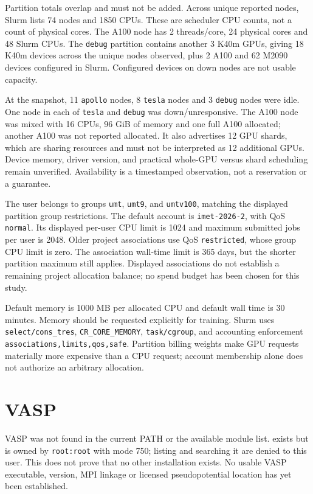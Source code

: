 \documentclass[10pt,a4paper]{article}
\begin{document}
Partition totals overlap and must not be added. Across unique reported nodes,
Slurm lists 74 nodes and 1850 CPUs. These are scheduler CPU counts, not a count of
physical cores. The A100 node has 2 threads/core, 24 physical cores and 48 Slurm CPUs.
The \texttt{debug} partition contains another 3 K40m GPUs, giving 18 K40m devices
across the unique nodes observed, plus 2 A100 and 62 M2090 devices configured in Slurm.
Configured devices on down nodes are not usable capacity.

At the snapshot, 11 \texttt{apollo} nodes, 8 \texttt{tesla} nodes and 3
\texttt{debug} nodes were idle. One node in each of \texttt{tesla} and
\texttt{debug} was down/unresponsive. The A100 node was mixed with 16 CPUs,
96 GiB of memory and one full A100 allocated; another A100 was not reported
allocated. It also advertises 12 GPU shards, which are sharing resources and
must not be interpreted as 12 additional GPUs. Device memory, driver version,
and practical whole-GPU versus shard scheduling remain unverified.
Availability is a timestamped observation, not a reservation or a guarantee.

The user belongs to groups \texttt{umt}, \texttt{umt9}, and \texttt{umtv100},
matching the displayed partition group restrictions. The default account is
\texttt{imet-2026-2}, with QoS \texttt{normal}. Its displayed per-user CPU limit
is 1024 and maximum submitted jobs per user is 2048. Older project associations
use QoS \texttt{restricted}, whose group CPU limit is zero.
The association wall-time limit is 365 days, but the shorter partition maximum
still applies. Displayed associations do not establish a remaining project
allocation balance; no spend budget has been chosen for this study.

Default memory is 1000 MB per allocated CPU and default wall time is 30 minutes.
Memory should be requested explicitly for training. Slurm uses
\texttt{select/cons\_tres}, \texttt{CR\_CORE\_MEMORY}, \texttt{task/cgroup},
and accounting enforcement \texttt{associations,limits,qos,safe}.
Partition billing weights make GPU requests materially more expensive than a CPU
request; account membership alone does not authorize an arbitrary allocation.

\section{VASP}
VASP was not found in the current PATH or the available module list.
 exists but is owned by \texttt{root:root} with mode 750;
listing and searching it are denied to this user. This does not prove that no
other installation exists. No usable VASP executable, version, MPI linkage or
licensed pseudopotential location has yet been established.
\end{document}
